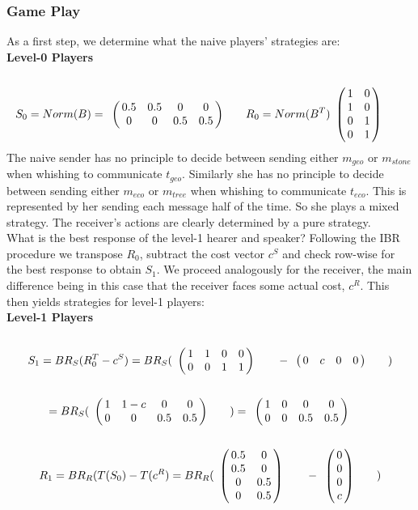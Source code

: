 \documentclass[10]{article}
\begin{document}
\subsubsection{Game Play}
As a first step, we determine what the naive players' strategies are:\\
\textbf{Level-0 Players}\\
\begin{equation*}
S_0=Norm(B)=
\bordermatrix{
            & & & &    \cr
 &       0.5 &         0.5 & 0       & 0 \cr
 &       0 &         0 & 0.5       & 0.5
 }\qquad
R_0=Norm(B^T)
\bordermatrix{
            &  & \cr
    & 1 & 0 \cr
     & 1 & 0 \cr
     & 0 & 1 \cr
     & 0 & 1 \cr
 }\qquad
\end{equation*}
The naive sender has no principle to decide between sending either $m_{geo}$ or $m_{stone}$ when whishing to communicate $t_{geo}$. Similarly she has no principle to decide between sending either $m_{eco}$ or $m_{tree}$ when whishing to communicate $t_{eco}$. This is represented by her sending each message half of the time. So she plays a mixed strategy. The receiver's actions are clearly determined by a pure strategy.\\
What is the best response of the level-1 hearer and speaker? Following the IBR procedure we transpose $R_0$, subtract the cost vector $c^S$ and check row-wise for the best response to obtain $S_1$. We proceed analogously for the receiver, the main difference being in this case that the receiver faces some actual cost, $c^R$. This then yields strategies for level-1 players:\\ %
\textbf{Level-1 Players}\\
\begin{equation*}
S_1= BR_S(R^T_0-c^S)=
BR_S(
\bordermatrix{
            & & & &    \cr
 &       1 &         1 & 0       & 0 \cr
 &       0 &         0 & 1      & 1
 }\qquad
-
\bordermatrix{
            & & & &    \cr
 &       0 &         c & 0       & 0 \cr
 }\qquad
)
\end{equation*}
\begin{equation*}
=BR_S(
\bordermatrix{
                & & & &    \cr
     &       1 &         1-c & 0       & 0 \cr
     &       0 &         0 & 0.5      & 0.5
 }\qquad
 )
=
\bordermatrix{
                 & & & &    \cr
      &       1 &         0 & 0       & 0 \cr
      &       0 &         0 & 0.5      & 0.5
  }\qquad
\end{equation*}
\begin{equation*}
R_1=BR_R(T(S_0)-T(c^R)=
BR_R(
\bordermatrix{
            &  & \cr
    & 0.5 & 0 \cr
     & 0.5 & 0 \cr
     & 0 & 0.5 \cr
     & 0 & 0.5 \cr
 }\qquad
-
\bordermatrix{
  & \cr
    & 0 \cr
     & 0 \cr
     & 0 \cr
     & c \cr
 }\qquad
)
\end{equation*}
\end{document}
